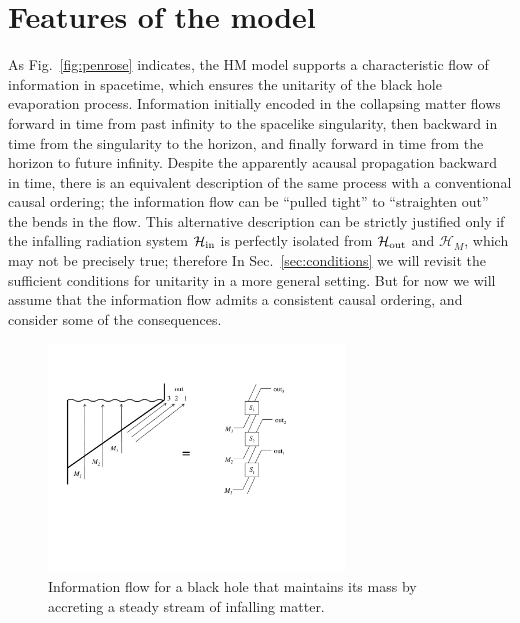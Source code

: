 \documentclass[11pt]{article}
\begin{document}
\section{Features of the model}
\label{sec:features}

As Fig.~\ref{fig:penrose} indicates, the HM model supports a characteristic flow of information in spacetime, which ensures the unitarity of the black hole evaporation process. Information initially encoded in the collapsing matter flows forward in time from past infinity to the spacelike singularity, then backward in time from the singularity to the horizon, and finally forward in time from the horizon to future infinity. Despite the apparently acausal propagation backward in time, there is an equivalent description of the same process with a conventional causal ordering; the information flow can be ``pulled tight'' to ``straighten out'' the bends in the flow. This alternative description can be strictly justified only if the infalling radiation system $\mathcal{H}_{\rm in}$ is perfectly isolated from $\mathcal{H}_{\rm out}$ and $\mathcal{H}_M$, which may not be precisely true; therefore In Sec.~\ref{sec:conditions} we will revisit the sufficient conditions for unitarity in a more general setting. But for now we will assume that the information flow admits a consistent causal ordering, and consider some of the consequences.

\begin{figure}
\begin{center}
\includegraphics[width=0.7\textwidth]{feed.pdf}
\end{center}
\caption{Information flow for a black hole that maintains its mass by accreting a steady stream of infalling matter.}
\label{fig:feed}
\end{figure}
\end{document}
